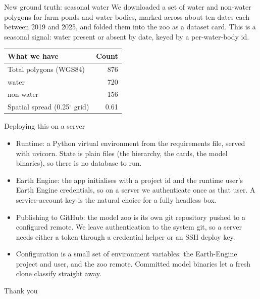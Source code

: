 \documentclass[aspectratio=169]{beamer}
\begin{document}
\begin{frame}{New ground truth: seasonal water}
We downloaded a set of water and non-water polygons for farm ponds and water bodies, marked across
about ten dates each between 2019 and 2025, and folded them into the zoo as a dataset card. This is a
seasonal signal: water present or absent by date, keyed by a per-water-body id.

\vspace{4mm}
\begin{center}
\begin{tabular}{lr}
\toprule
What we have & Count \\
\midrule
Total polygons (WGS84) & 876 \\
\quad water & 720 \\
\quad non-water & 156 \\
Spatial spread (0.25$^\circ$ grid) & 0.61 \\
\bottomrule
\end{tabular}
\end{center}
\end{frame}

\begin{frame}{Deploying this on a server}
\begin{itemize}
  \item Runtime: a Python virtual environment from the requirements file, served with uvicorn. State
  is plain files (the hierarchy, the cards, the model binaries), so there is no database to run.
  \item Earth Engine: the app initialises with a project id and the runtime user's Earth Engine
  credentials, so on a server we authenticate once as that user. A service-account key is the natural
  choice for a fully headless box.
  \item Publishing to GitHub: the model zoo is its own git repository pushed to a configured remote.
  We leave authentication to the system git, so a server needs either a token through a credential
  helper or an SSH deploy key.
  \item Configuration is a small set of environment variables: the Earth-Engine project and user, and
  the zoo remote. Committed model binaries let a fresh clone classify straight away.
\end{itemize}
\end{frame}

\begin{frame}
\centering
\vspace{1.5cm}
{\Large Thank you}
\vspace{0.5cm}


\end{frame}
\end{document}
